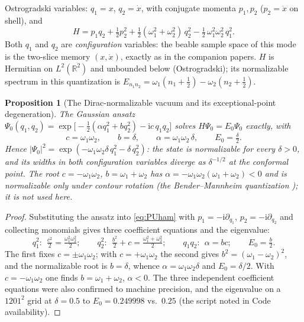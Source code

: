 \documentclass[11pt]{article}
\newtheorem{proposition}[theorem]{Proposition}
\theoremstyle{definition}
\theoremstyle{remark}
\newcommand{\ii}{\mathrm{i}}
\begin{document}
Ostrogradski variables: $q_{1}=x$, $q_{2}=\dot x$, with conjugate
momenta $p_{1},p_{2}$ ($p_{2}=\ddot x$ on shell), and
\begin{equation}
H=p_{1}q_{2}+\tfrac12 p_{2}^{2}
+\tfrac12(\omega_{1}^{2}+\omega_{2}^{2})\,q_{2}^{2}
-\tfrac12\,\omega_{1}^{2}\omega_{2}^{2}\,q_{1}^{2}.
\label{eq:PUham}
\end{equation}
Both $q_{1}$ and $q_{2}$ are \emph{configuration} variables: the
beable sample space of this mode is the two-slice memory
$(x,\dot x)$, exactly as in the companion papers. $H$ is Hermitian on
$L^{2}(\mathbb{R}^{2})$ and unbounded below (Ostrogradski); its
normalizable spectrum in this quantization is
$E_{n_{1}n_{2}}=\omega_{1}(n_{1}+\tfrac12)
-\omega_{2}(n_{2}+\tfrac12)$.

\begin{proposition}[The Dirac-normalizable vacuum and its
exceptional-point degeneration]
\label{prop:vacuum}
The Gaussian ansatz
$\Psi_{0}(q_{1},q_{2})
=\exp\bigl[-\tfrac12(\alpha q_{1}^{2}+bq_{2}^{2})-\ii c\,q_{1}q_{2}\bigr]$
solves $H\Psi_{0}=E_{0}\Psi_{0}$ exactly, with
\begin{equation}
c=\omega_{1}\omega_{2},\qquad
b=\delta,\qquad
\alpha=\omega_{1}\omega_{2}\,\delta,\qquad
E_{0}=\tfrac{\delta}{2}.
\label{eq:vacuum}
\end{equation}
Hence $|\Psi_{0}|^{2}
=\exp(-\omega_{1}\omega_{2}\delta\,q_{1}^{2}-\delta\,q_{2}^{2})$: the
state is normalizable for every $\delta>0$, and its widths in
\emph{both} configuration variables diverge as $\delta^{-1/2}$ at the
conformal point. The root $c=-\omega_{1}\omega_{2}$,
$b=\omega_{1}+\omega_{2}$ has $\alpha=-\omega_{1}\omega_{2}
(\omega_{1}+\omega_{2})<0$ and is normalizable only under contour
rotation (the Bender--Mannheim quantization
\cite{BenderMannheim2008}); it is not used here.
\end{proposition}

\begin{proof}
Substituting the ansatz into \eqref{eq:PUham} with
$p_{1}=-\ii\partial_{q_{1}}$, $p_{2}=-\ii\partial_{q_{2}}$ and
collecting monomials gives three coefficient equations and the
eigenvalue:
\[
q_{1}^{2}:\ \ \tfrac{c^{2}}{2}
=\tfrac{\omega_{1}^{2}\omega_{2}^{2}}{2};
\qquad
q_{2}^{2}:\ \ \tfrac{b^{2}}{2}+c
=\tfrac{\omega_{1}^{2}+\omega_{2}^{2}}{2};
\qquad
q_{1}q_{2}:\ \ \alpha=bc;
\qquad
E_{0}=\tfrac{b}{2}.
\]
The first fixes $c=\pm\omega_{1}\omega_{2}$; with
$c=+\omega_{1}\omega_{2}$ the second gives
$b^{2}=(\omega_{1}-\omega_{2})^{2}$, and the normalizable root is
$b=\delta$, whence $\alpha=\omega_{1}\omega_{2}\delta$ and
$E_{0}=\delta/2$. With $c=-\omega_{1}\omega_{2}$ one finds
$b=\omega_{1}+\omega_{2}$, $\alpha<0$. The three independent coefficient
equations were
also confirmed to machine precision, and the eigenvalue on a
$1201^{2}$ grid at $\delta=0.5$ to $E_{0}=0.249998$ vs.\ $0.25$
(the script noted in Code availability).
\end{proof}
\end{document}

